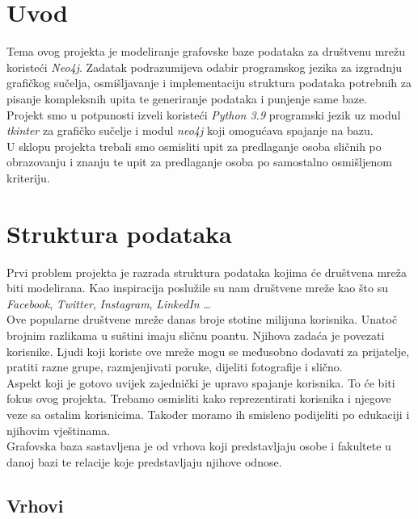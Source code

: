 \documentclass[titlepage, 12pt]{scrartcl}
\begin{document}
\tableofcontents

\newpage

\section{Uvod}
Tema ovog projekta je modeliranje grafovske baze podataka za društvenu mrežu koristeći \emph{Neo4j}. Zadatak podrazumijeva odabir programskog jezika za izgradnju grafičkog sučelja, osmišljavanje i implementaciju struktura podataka potrebnih za pisanje kompleksnih upita te generiranje podataka i punjenje same baze. \\
Projekt smo u potpunosti izveli koristeći \emph{Python 3.9} programski jezik uz modul \emph{tkinter} za grafičko sučelje i modul \emph{neo4j} koji omogućava spajanje na bazu. \\
U sklopu projekta trebali smo osmisliti upit za predlaganje osoba sličnih po obrazovanju i znanju te upit za predlaganje osoba po samostalno osmišljenom kriteriju.

\newpage
\section{Struktura podataka}
Prvi problem projekta je razrada struktura podataka kojima će društvena mreža biti modelirana. Kao inspiracija poslužile su nam društvene mreže kao što su \emph{Facebook}, \emph{Twitter}, \emph{Instagram}, \emph{LinkedIn} \dots \\
Ove popularne društvene mreže danas broje stotine milijuna korisnika. Unatoč brojnim razlikama u suštini imaju sličnu poantu. Njihova zadaća je povezati korisnike. Ljudi koji koriste ove mreže mogu se međusobno dodavati za prijatelje, pratiti razne grupe, razmjenjivati poruke, dijeliti fotografije i slično. \\
Aspekt koji je gotovo uvijek zajednički je upravo spajanje korisnika. To će biti fokus ovog projekta. Trebamo osmisliti kako reprezentirati korisnika i njegove veze sa ostalim korisnicima. Također moramo ih smisleno podijeliti po edukaciji i njihovim vještinama. \\
Grafovska baza sastavljena je od vrhova koji predstavljaju osobe i fakultete u danoj bazi te relacije koje predstavljaju njihove odnose.

\subsection{Vrhovi}
\end{document}
